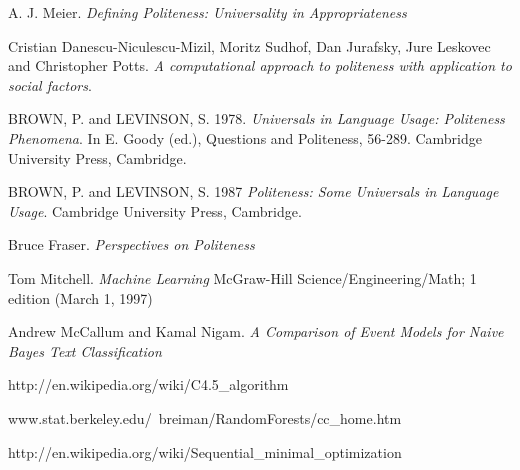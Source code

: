 \documentclass[conference]{IEEEtran}
\begin{document}
\begin{thebibliography}{1}

A. J. Meier. \textit{Defining Politeness: Universality in Appropriateness}

Cristian Danescu-Niculescu-Mizil, Moritz Sudhof, Dan Jurafsky, Jure Leskovec and Christopher Potts. \textit{A computational approach to politeness with application to social factors}.

BROWN, P. and LEVINSON, S. 1978. \textit{Universals in Language Usage: Politeness Phenomena}. In E. Goody (ed.), Questions and Politeness, 56-289. Cambridge University Press, Cambridge.

BROWN, P. and LEVINSON, S. 1987 \textit{Politeness: Some Universals in Language Usage}. Cambridge University Press, Cambridge.

Bruce Fraser. \textit{Perspectives on Politeness}

Tom Mitchell. \textit{Machine Learning} McGraw-Hill Science/Engineering/Math; 1 edition (March 1, 1997)

Andrew McCallum and Kamal Nigam. \textit{A Comparison of Event Models for Naive Bayes Text Classification}

http://en.wikipedia.org/wiki/C4.5\_algorithm

www.stat.berkeley.edu/~breiman/RandomForests/cc\_home.htm

http://en.wikipedia.org/wiki/Sequential\_minimal\_optimization

\end{thebibliography}



\end{document}
